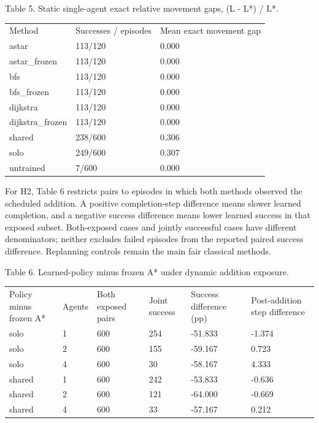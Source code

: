 \documentclass[10pt,a4paper]{article}
\begin{document}
Table 5. Static single-agent exact relative movement gaps, (L - L*) / L*.



{\footnotesize\begin{longtable}{p{}p{}p{}}
Method & Successes / episodes & Mean exact movement gap \\
astar & 113/120 & 0.000 \\
astar\_frozen & 113/120 & 0.000 \\
bfs & 113/120 & 0.000 \\
bfs\_frozen & 113/120 & 0.000 \\
dijkstra & 113/120 & 0.000 \\
dijkstra\_frozen & 113/120 & 0.000 \\
shared & 238/600 & 0.306 \\
solo & 249/600 & 0.307 \\
untrained & 7/600 & 0.000 \\
\end{longtable}}



For H2, Table 6 restricts pairs to episodes in which both methods observed the scheduled addition. A positive completion-step difference means slower learned completion, and a negative success difference means lower learned success in that exposed subset. Both-exposed cases and jointly successful cases have different denominators; neither excludes failed episodes from the reported paired success difference. Replanning controls remain the main fair classical methods.



Table 6. Learned-policy minus frozen A* under dynamic addition exposure.



{\footnotesize\begin{longtable}{p{}p{}p{}p{}p{}p{}}
Policy minus frozen A* & Agents & Both exposed pairs & Joint success & Success difference (pp) & Post-addition step difference \\
solo & 1 & 600 & 254 & -51.833 & -1.374 \\
solo & 2 & 600 & 155 & -59.167 & 0.723 \\
solo & 4 & 600 & 30 & -58.167 & 4.333 \\
shared & 1 & 600 & 242 & -53.833 & -0.636 \\
shared & 2 & 600 & 121 & -64.000 & -0.669 \\
shared & 4 & 600 & 33 & -57.167 & 0.212 \\
\end{longtable}}
\end{document}
